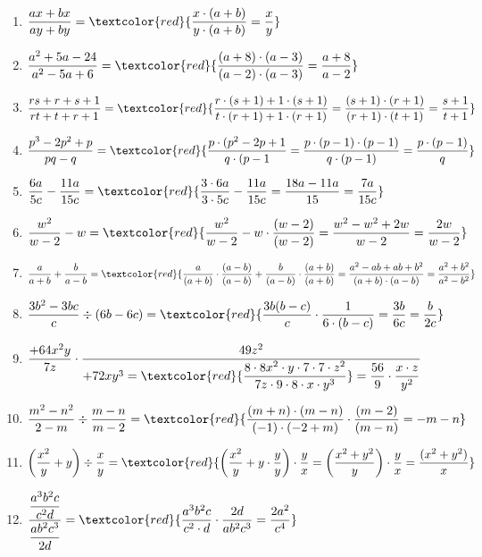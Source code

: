 \documentclass[11pt, a4paper, twoside, fleqn]{article}
\begin{document}
\begin{enumerate} [itemsep=3ex]
\item $ \dfrac{ax + bx}{ay + by} = \textcolor{red}{\dfrac{x \cdot (a+b)}{y \cdot (a+b)} = \dfrac{x}{y}} $
\item $ \dfrac{a^{2} + 5a -24}{a^{2} - 5a + 6} = \textcolor{red}{\dfrac{(a + 8) \cdot (a - 3)}{(a - 2) \cdot (a-3)} = \dfrac{a + 8}{a - 2}} $
\item $ \dfrac{rs + r + s + 1}{rt + t +r + 1} = \textcolor{red}{\dfrac{r \cdot (s + 1) + 1 \cdot(s + 1)}{t \cdot(r + 1) +1 \cdot (r + 1)} = \dfrac{(s + 1) \cdot (r + 1)}{(r + 1) \cdot (t + 1)} = \dfrac{s + 1}{t + 1}} $
\item $ \dfrac{p^{3} - 2p^{2} + p}{pq - q} = \textcolor{red}{\dfrac{p \cdot (p^{2} - 2p + 1}{q \cdot (p - 1} = \dfrac{p \cdot (p - 1) \cdot (p - 1)}{q \cdot (p-1)} = \dfrac{p \cdot (p - 1)}{q}} $ 
\item $ \dfrac{6a}{5c} - \dfrac{11a}{15c} = \textcolor{red}{\dfrac{3 \cdot 6a}{3 \cdot 5c} - \dfrac{11a}{15c} = \dfrac{18a - 11a}{15}= \dfrac{7a}{15c}} $
\item $ \dfrac{w^{2}}{w - 2} - w = \textcolor{red}{\dfrac{w^{2}}{w - 2} - w \cdot \dfrac{(w - 2)}{(w - 2)} = \dfrac{w^{2} - w^{2} + 2w}{w - 2} = \dfrac{2w}{w - 2}} $
\item $ \dfrac{a}{a + b} + \dfrac{b}{a - b} = \textcolor{red}{\dfrac{a}{(a + b)} \cdot \dfrac{(a - b)}{(a - b)} + \dfrac{b}{(a - b)} \cdot \dfrac{
(a + b)}{(a + b)} = \dfrac{ a^{2} - ab + ab + b^{2}}{(a + b) \cdot (a - b)} = \dfrac{a^{2} + b^{2}}{a^{2} - b^{2}}} $
\item $ \dfrac{3b^{2} - 3bc}{c} \div (6b - 6c) = \textcolor{red}{\dfrac{3b(b - c)}{c} \cdot \dfrac{1}{6 \cdot (b - c)} = \dfrac{3b}{6c} = \dfrac{b}{2c}} $
\item $ \dfrac{+64x^{2}y}{7z} \cdot \dfrac{49z^{2}}{+72xy^{3} = \textcolor{red}{\dfrac{8 \cdot 8x^{2} \cdot y \cdot 7 \cdot 7 \cdot z^{2}}{7z \cdot 9 \cdot 8 \cdot x \cdot y^{3}}} = \dfrac{56}{9} \cdot \dfrac{ x \cdot z}{y^{2}}} $
\item $ \dfrac{m^{2} - n^{2}}{2 - m} \div \dfrac{m - n}{m - 2} = \textcolor{red}{\dfrac{(m + n) \cdot (m - n)}{(-1) \cdot (-2 + m)} \cdot \dfrac{(m - 2)}{(m - n)} = -m -n} $
\item $ \left(\dfrac{x^{2}}{y} + y \right) \div \dfrac{x}{y} = \textcolor{red}{\left(\dfrac{x^{2}}{y} + y \cdot \dfrac{y}{y}\right) \cdot \dfrac{y}{x} = \left(\dfrac{x^{2} + y^{2}}{y} \right) \cdot \dfrac{y}{x} = \dfrac{(x^{2} + y^{2})}{x}} $ 
\item $ \dfrac{\dfrac{a^{3}b^{2}c}{c^{2}d}}{\dfrac{ab^{2}c^{3}}{2d}} = \textcolor{red}{\dfrac{a^{3}b^{2}c}{c^{2} \cdot d} \cdot \dfrac{2d}{ab^{2}c^{3}} = \dfrac{2a^{2}}{c^{4}}} $

\end{enumerate}
\end{document}
